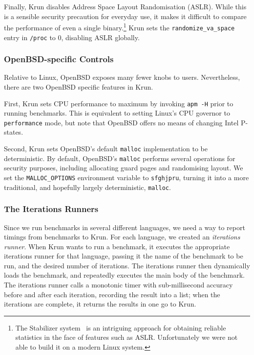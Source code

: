 \documentclass[10pt,preprint]{sigplanconf}
\newcommand{\krun}{Krun\xspace}
\begin{document}
Finally, \krun disables Address Space Layout Randomisation (ASLR). While this is
a sensible security precaution for everyday use, it makes it difficult to
compare the performance of even a single binary.\footnote{The Stabilizer
system~\cite{curtsinger} is an intriguing approach for obtaining reliable
statistics in the face of features such as ASLR. Unfortunately we were not able
to build it on a modern Linux system.} \krun sets the
\texttt{randomize\_va\_space} entry in \texttt{/proc} to 0, disabling ASLR
globally.


\subsubsection{OpenBSD-specific Controls}

Relative to Linux, OpenBSD exposes many fewer knobs to users. Nevertheless,
there are two OpenBSD specific features in \krun.

First, \krun sets CPU performance to maximum by invoking \texttt{apm -H} prior
to running benchmarks. This is equivalent to setting Linux's CPU governor to
\texttt{performance} mode, but note that OpenBSD offers no means of changing
Intel P-states.

Second, \krun sets OpenBSD's default \texttt{malloc} implementation to be
deterministic. By default, OpenBSD's \texttt{malloc} performs several operations
for security purposes, including allocating guard pages and randomising layout.
We set the \texttt{MALLOC\_OPTIONS} environment variable to \texttt{sfghjpru},
turning it into a more traditional, and hopefully largely deterministic,
\texttt{malloc}.


\subsubsection{The Iterations Runners}

Since we run benchmarks in several different languages, we need a way to report
timings from benchmarks to \krun. For each language, we created an
\emph{iterations runner}. When \krun wants to run a benchmark, it executes the
appropriate iterations runner for that language, passing it the name of the
benchmark to be run, and the desired number of iterations. The iterations runner
then dynamically loads the benchmark, and repeatedly executes the main body of
the benchmark. The iterations runner calls a monotonic timer with
sub-millisecond accuracy before and after each iteration, recording the result
into a list; when the iterations are complete, it returns the results in one go
to \krun.
\end{document}
